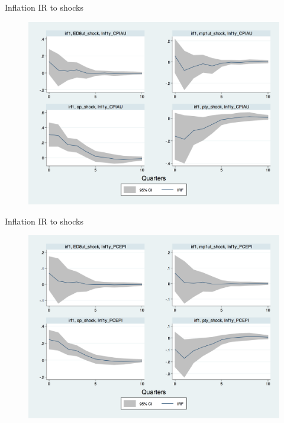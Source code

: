 \documentclass{beamer}
\begin{document}
\begin{frame}{Inflation IR to  shocks}

\begin{figure}
	\includegraphics[scale=0.3]{figures/CPIAU_ashocks.png} 
\end{figure}

\end{frame}



\begin{frame}{Inflation IR to  shocks}

\begin{figure}
	\includegraphics[scale=0.3]{figures/PCEPI_ashocks.png} 
\end{figure}

\end{frame}
\end{document}
